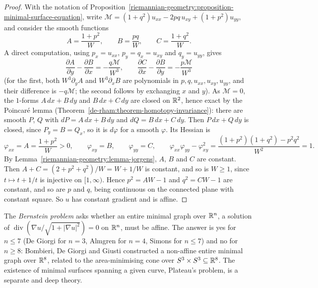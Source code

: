 \begin{proof}
With the notation of Proposition~\ref{riemannian-geometry:proposition-minimal-surface-equation}, write $\mathcal{M} = (1 + q^2)u_{xx} - 2pq\,u_{xy} + (1 + p^2)u_{yy}$, and
consider the smooth functions
\[
A = \frac{1 + p^2}{W}, \qquad B = \frac{pq}{W}, \qquad C = \frac{1 + q^2}{W}.
\]
A direct computation, using $p_x = u_{xx}$, $p_y = q_x = u_{xy}$ and $q_y = u_{yy}$, gives
\[
\frac{\partial A}{\partial y} - \frac{\partial B}{\partial x} = -\frac{q\mathcal{M}}{W^3}, \qquad \frac{\partial C}{\partial x} - \frac{\partial B}{\partial y} = -\frac{p\mathcal{M}}{W^3}
\]
(for the first, both $W^3\partial_yA$ and $W^3\partial_xB$ are polynomials in $p, q, u_{xx}, u_{xy}, u_{yy}$, and their difference is $-q\mathcal{M}$; the second follows by
exchanging $x$ and $y$). As $\mathcal{M} = 0$, the $1$-forms $A\,dx + B\,dy$ and $B\,dx + C\,dy$ are closed on $\mathbb{R}^2$, hence exact by the Poincar\'e lemma
(Theorem~\ref{de-rham:theorem-homotopy-invariance}): there are smooth $P$, $Q$ with $dP = A\,dx + B\,dy$ and $dQ = B\,dx + C\,dy$. Then $P\,dx + Q\,dy$ is closed, since
$P_y = B = Q_x$, so it is $d\varphi$ for a smooth $\varphi$. Its Hessian is
\[
\varphi_{xx} = A = \frac{1 + p^2}{W} > 0, \qquad \varphi_{xy} = B, \qquad \varphi_{yy} = C, \qquad \varphi_{xx}\varphi_{yy} - \varphi_{xy}^2 = \frac{(1 + p^2)(1 + q^2) - p^2q^2}{W^2} = 1 .
\]
By Lemma~\ref{riemannian-geometry:lemma-jorgens}, $A$, $B$ and $C$ are constant. Then $A + C = (2 + p^2 + q^2)/W = W + 1/W$ is constant, and so is $W \geq 1$, since
$t \mapsto t + 1/t$ is injective on $[1, \infty)$. Hence $p^2 = AW - 1$ and $q^2 = CW - 1$ are constant, and so are $p$ and $q$, being continuous on the connected plane with
constant square. So $u$ has constant gradient and is affine.
\end{proof}

\begin{remark}\label{riemannian-geometry:remark-bernstein-problem}
The \emph{Bernstein problem} asks whether an entire minimal graph over $\mathbb{R}^n$, a solution of $\operatorname{div}(\nabla u/\sqrt{1 + |\nabla u|^2}) = 0$ on $\mathbb{R}^n$, must be
affine. The answer is yes for $n \leq 7$ (De Giorgi for $n = 3$, Almgren for $n = 4$, Simons \cite{simons-1968} for $n \leq 7$) and no for $n \geq 8$: Bombieri, De Giorgi and
Giusti \cite{bombieri-de-giorgi-giusti-1969} constructed a non-affine entire minimal graph over $\mathbb{R}^8$, related to the area-minimising cone over
$S^3 \times S^3 \subseteq \mathbb{R}^8$. The existence of minimal surfaces spanning a given curve, Plateau's problem, is a separate and deep theory.
\end{remark}

